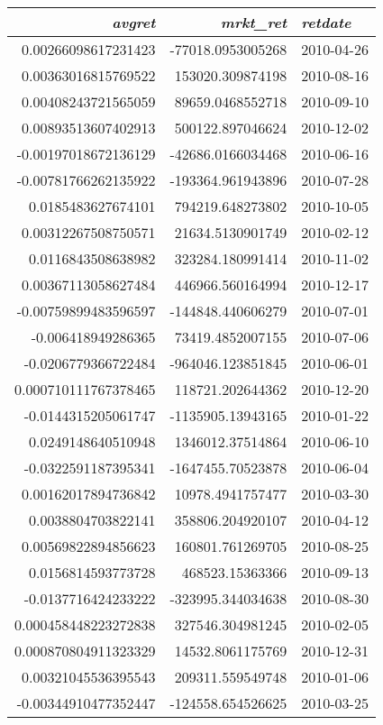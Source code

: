 \begin{tabular}{r | r | l}
\textit{avgret} & \textit{mrkt\_ret} & \textit{retdate} \\
\hline
0.00266098617231423 & -77018.0953005268 & 2010-04-26 \\
0.00363016815769522 & 153020.309874198 & 2010-08-16 \\
0.00408243721565059 & 89659.0468552718 & 2010-09-10 \\
0.00893513607402913 & 500122.897046624 & 2010-12-02 \\
-0.00197018672136129 & -42686.0166034468 & 2010-06-16 \\
-0.00781766262135922 & -193364.961943896 & 2010-07-28 \\
0.0185483627674101 & 794219.648273802 & 2010-10-05 \\
0.00312267508750571 & 21634.5130901749 & 2010-02-12 \\
0.0116843508638982 & 323284.180991414 & 2010-11-02 \\
0.00367113058627484 & 446966.560164994 & 2010-12-17 \\
-0.00759899483596597 & -144848.440606279 & 2010-07-01 \\
-0.006418949286365 & 73419.4852007155 & 2010-07-06 \\
-0.0206779366722484 & -964046.123851845 & 2010-06-01 \\
0.000710111767378465 & 118721.202644362 & 2010-12-20 \\
-0.0144315205061747 & -1135905.13943165 & 2010-01-22 \\
0.0249148640510948 & 1346012.37514864 & 2010-06-10 \\
-0.0322591187395341 & -1647455.70523878 & 2010-06-04 \\
0.00162017894736842 & 10978.4941757477 & 2010-03-30 \\
0.0038804703822141 & 358806.204920107 & 2010-04-12 \\
0.00569822894856623 & 160801.761269705 & 2010-08-25 \\
0.0156814593773728 & 468523.15363366 & 2010-09-13 \\
-0.0137716424233222 & -323995.344034638 & 2010-08-30 \\
0.000458448223272838 & 327546.304981245 & 2010-02-05 \\
0.000870804911323329 & 14532.8061175769 & 2010-12-31 \\
0.00321045536395543 & 209311.559549748 & 2010-01-06 \\
-0.00344910477352447 & -124558.654526625 & 2010-03-25 \\

\end{tabular}
